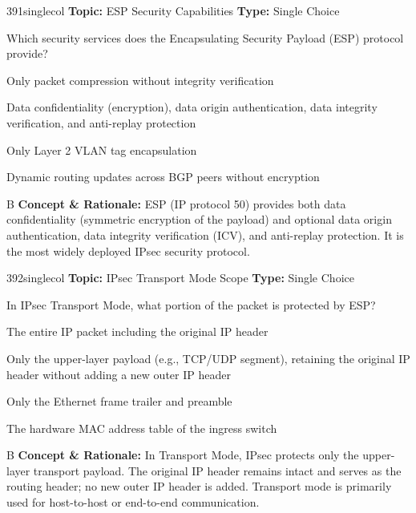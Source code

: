 \begin{qcard}{391}{singlecol}
\textcolor{darkslate!75}{\small\textbf{Topic:} ESP Security Capabilities \hfill \textbf{Type:} Single Choice}\vspace{0.4em}\par
Which security services does the Encapsulating Security Payload (ESP) protocol provide?
\begin{qoptions}
\item Only packet compression without integrity verification
\item Data confidentiality (encryption), data origin authentication, data integrity verification, and anti-replay protection
\item Only Layer 2 VLAN tag encapsulation
\item Dynamic routing updates across BGP peers without encryption
\end{qoptions}
\end{qcard}
\nopagebreak
\begin{explainbox}{B}
\textbf{Concept \& Rationale:} ESP (IP protocol 50) provides both data confidentiality (symmetric encryption of the payload) and optional data origin authentication, data integrity verification (ICV), and anti-replay protection. It is the most widely deployed IPsec security protocol.
\end{explainbox}

\begin{qcard}{392}{singlecol}
\textcolor{darkslate!75}{\small\textbf{Topic:} IPsec Transport Mode Scope \hfill \textbf{Type:} Single Choice}\vspace{0.4em}\par
In IPsec Transport Mode, what portion of the packet is protected by ESP?
\begin{qoptions}
\item The entire IP packet including the original IP header
\item Only the upper-layer payload (e.g., TCP/UDP segment), retaining the original IP header without adding a new outer IP header
\item Only the Ethernet frame trailer and preamble
\item The hardware MAC address table of the ingress switch
\end{qoptions}
\end{qcard}
\nopagebreak
\begin{explainbox}{B}
\textbf{Concept \& Rationale:} In Transport Mode, IPsec protects only the upper-layer transport payload. The original IP header remains intact and serves as the routing header; no new outer IP header is added. Transport mode is primarily used for host-to-host or end-to-end communication.
\end{explainbox}

